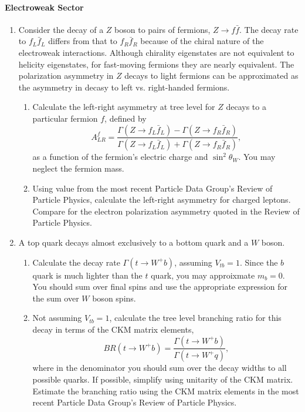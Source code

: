 \documentclass[letterpaper,11pt]{article}
\begin{document}
\paragraph*{Electroweak Sector}
\begin{enumerate}
  \item Consider the decay of a $Z$ boson to pairs of fermions, $Z \to f\bar{f}$. The decay rate to $f_L\bar{f}_L$ differs from that to $f_R\bar{f}_R$ because of the chiral nature of the electroweak interactions. Although chirality eigenstates are not equivalent to helicity eigenstates, for fast-moving fermions they are nearly equivalent. The polarization asymmetry in $Z$ decays to light fermions can be approximated as the asymmetry in decasy to left vs. right-handed fermions.
  \begin{enumerate}
    \item Calculate the left-right asymmetry at tree level for $Z$ decays to a particular fermion $f$, defined by
    \begin{equation}
      A^f_{LR} = \frac{\Gamma(Z \to f_L\bar{f}_L) - \Gamma(Z \to f_R\bar{f}_R)}{\Gamma(Z \to f_L\bar{f}_L) + \Gamma(Z \to f_R\bar{f}_R)},
    \end{equation}
    as a function of the fermion's electric charge and $\sin^2\theta_W$. You may neglect the fermion mass.
    \item Using value from the most recent Particle Data Group's Review of Particle Physics, calculate the left-right asymmetry for charged leptons. Compare for the electron polarization asymmetry quoted in the Review of Particle Physics.
  \end{enumerate}
  \item A top quark decays almost exclusively to a bottom quark and a $W$ boson.
  \begin{enumerate}
    \item Calculate the decay rate $\Gamma(t \to W^+ b)$, assuming $V_{tb} = 1$. Since the $b$ quark is much lighter than the $t$ quark, you may approixmate $m_b = 0$. You should sum over final spins and use the appropriate expression for the sum over $W$ boson spins.
    \item Not assuming $V_{tb} = 1$, calculate the tree level branching ratio for this decay in terms of the CKM matrix elements,
    \begin{equation}
      BR(t \to W^+ b) = \frac{\Gamma(t \to W^+ b)}{\Gamma(t \to W^+ q)},
    \end{equation}
    where in the denominator you should sum over the decay widths to all possible quarks. If possible, simplify using unitarity of the CKM matrix. Estimate the branching ratio using the CKM matrix elements in the most recent Particle Data Group's Review of Particle Physics.
  \end{enumerate}
\end{enumerate}
\end{document}
